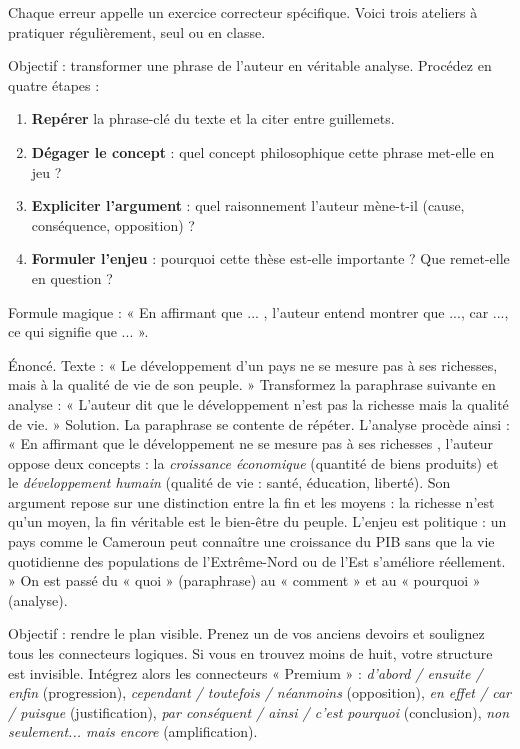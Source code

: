 \documentclass[11pt]{article}
\newcounter{popsec}
\newcounter{popsub}
\newcommand{\courssub}[1]{%
  \stepcounter{popsub}%
  \par\vspace{9pt}\noindent{\popxbold\fontsize{11.5}{13}\selectfont\color{popink}{\color{poporange}\thepopsec.\thepopsub}\hspace{6pt}#1}\par\nopagebreak\vspace{4pt}
}
\begin{document}
\courssub{Remédiation ciblée : trois ateliers}

Chaque erreur appelle un exercice correcteur spécifique. Voici trois ateliers à pratiquer régulièrement, seul ou en classe.

\begin{methode}
Objectif : transformer une phrase de l'auteur en véritable analyse. Procédez en quatre étapes :
\begin{enumerate}
\item \textbf{Repérer} la phrase-clé du texte et la citer entre guillemets.
\item \textbf{Dégager le concept} : quel concept philosophique cette phrase met-elle en jeu ?
\item \textbf{Expliciter l'argument} : quel raisonnement l'auteur mène-t-il (cause, conséquence, opposition) ?
\item \textbf{Formuler l'enjeu} : pourquoi cette thèse est-elle importante ? Que remet-elle en question ?
\end{enumerate}
Formule magique : « En affirmant que \og ... \fg, l'auteur entend montrer que ..., car ..., ce qui signifie que ... ».
\end{methode}

\begin{exoresolu}
Énoncé. Texte : « Le développement d'un pays ne se mesure pas à ses richesses, mais à la qualité de vie de son peuple. » Transformez la paraphrase suivante en analyse : « L'auteur dit que le développement n'est pas la richesse mais la qualité de vie. »
\tcblower
Solution. La paraphrase se contente de répéter. L'analyse procède ainsi : « En affirmant que le développement \og ne se mesure pas à ses richesses \fg, l'auteur oppose deux concepts : la \emph{croissance économique} (quantité de biens produits) et le \emph{développement humain} (qualité de vie : santé, éducation, liberté). Son argument repose sur une distinction entre la fin et les moyens : la richesse n'est qu'un moyen, la fin véritable est le bien-être du peuple. L'enjeu est politique : un pays comme le Cameroun peut connaître une croissance du PIB sans que la vie quotidienne des populations de l'Extrême-Nord ou de l'Est s'améliore réellement. » On est passé du « quoi » (paraphrase) au « comment » et au « pourquoi » (analyse).
\end{exoresolu}

\begin{methode}
Objectif : rendre le plan visible. Prenez un de vos anciens devoirs et soulignez tous les connecteurs logiques. Si vous en trouvez moins de huit, votre structure est invisible. Intégrez alors les connecteurs « Premium » : \emph{d'abord / ensuite / enfin} (progression), \emph{cependant / toutefois / néanmoins} (opposition), \emph{en effet / car / puisque} (justification), \emph{par conséquent / ainsi / c'est pourquoi} (conclusion), \emph{non seulement... mais encore} (amplification).
\end{methode}
\end{document}
